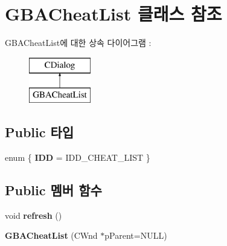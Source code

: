 \hypertarget{class_g_b_a_cheat_list}{}\section{G\+B\+A\+Cheat\+List 클래스 참조}
\label{class_g_b_a_cheat_list}
G\+B\+A\+Cheat\+List에 대한 상속 다이어그램 \+: \begin{figure}[H]
\begin{center}
\leavevmode
\includegraphics[height=2.000000cm]{class_g_b_a_cheat_list}
\end{center}
\end{figure}
\subsection*{Public 타입}
\begin{DoxyCompactItemize}
\item 
\mbox{\label{class_g_b_a_cheat_list_a5248aad32e8c4e9324c6921e0ff5bf73}} 
enum \{ {\bfseries I\+DD} = I\+D\+D\+\_\+\+C\+H\+E\+A\+T\+\_\+\+L\+I\+ST
 \}
\end{DoxyCompactItemize}
\subsection*{Public 멤버 함수}
\begin{DoxyCompactItemize}
\item 
\mbox{\label{class_g_b_a_cheat_list_a12928bb674926ae02d5a3ceb156a3b53}} 
void {\bfseries refresh} ()
\item 
\mbox{\label{class_g_b_a_cheat_list_a0310a79ee81d4d26e02e347e1eacbf95}} 
{\bfseries G\+B\+A\+Cheat\+List} (C\+Wnd $\ast$p\+Parent=N\+U\+LL)
\end{DoxyCompactItemize}
